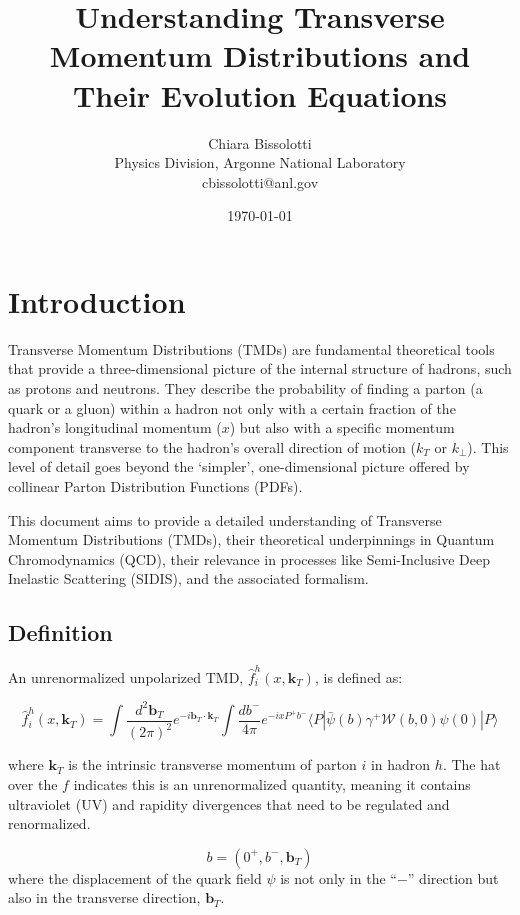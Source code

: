 \documentclass{article}
\title{Understanding Transverse Momentum Distributions and Their Evolution Equations}
\author{Chiara Bissolotti\\
        Physics Division, Argonne National Laboratory \\
        cbissolotti@anl.gov}
\date{\today}
\begin{document}
\maketitle
\tableofcontents
\newpage

\section{Introduction}

Transverse Momentum Distributions (TMDs) are fundamental theoretical tools that provide a three-dimensional picture of the internal structure of
hadrons, such as protons and neutrons. They describe the probability of finding a parton (a quark or a gluon) within a hadron not only with a certain
fraction of the hadron's longitudinal momentum ($x$) but also with a specific momentum component transverse to the hadron's overall direction of
motion ($k_T$ or $k_\perp$). This level of detail goes beyond the `simpler', one-dimensional picture offered by collinear Parton Distribution
Functions (PDFs).

This document aims to provide a detailed understanding of Transverse Momentum Distributions (TMDs), their theoretical underpinnings in Quantum
Chromodynamics (QCD), their relevance in processes like Semi-Inclusive Deep Inelastic Scattering (SIDIS), and the associated formalism.

\subsection{Definition}

An unrenormalized unpolarized TMD, $\hat{f}_i^{h}(x, \mathbf{k}_T)$, is defined as:

\begin{equation}
  \hat{f}_i^{h}(x, \mathbf{k}_T) = \int \frac{d^2 \mathbf{b}_T}{{(2\pi)}^2} e^{-i \mathbf{b}_T \cdot \mathbf{k}_T} \int \frac{db^-}{4\pi}
  e^{-ix P^+ b^-} \langle P | \bar{\psi}(b) \gamma^+ {\mathcal{W}{(b,0)}} \psi(0) | P \rangle
  \label{eq:correlator_definition}
\end{equation}

where $\mathbf{k}_T$ is the intrinsic transverse momentum of parton $i$ in hadron $h$. The hat over the $f$ indicates this is an unrenormalized
quantity, meaning it contains ultraviolet (UV) and rapidity divergences that need to be regulated and renormalized.

\begin{equation}
  b = (0^{+}, b^-, \mathbf{b}_T)
\end{equation}
%
where the displacement of the quark field $\psi$ is not only in the ``$-$'' direction but also in the transverse direction, $\mathbf{b}_T$.
\end{document}
